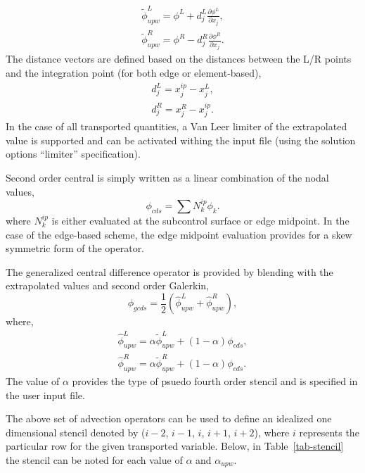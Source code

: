 \begin{eqnarray}
  \tilde \phi^L_{upw} = \phi^L + d^L_j \frac{\partial \phi^L }{\partial x_j}, \nonumber \\
  \tilde \phi^R_{upw} = \phi^R - d^R_j \frac{\partial \phi^R }{\partial x_j}.
\label{advUpwLR}
\end{eqnarray}
%
The distance vectors are defined based on the distances between the L/R points and the integration point 
(for both edge or element-based),
\begin{eqnarray}
  d^L_j = x^{ip}_j - x^L_j, \nonumber \\
  d^R_j = x^R_j - x^{ip}_j. 
\end{eqnarray}
\label{distanceVec}
In the case of all transported quantities, a Van Leer limiter of the extrapolated value is supported
and can be activated withing the input file (using the solution options ``limiter'' specification).

Second order central is simply written as a linear combination of the nodal values,
\begin{equation}
 \phi_{cds} = \sum N^{ip}_k \phi_k.
\label{phiCentral}
\end{equation}
%
where $N^{ip}_k$ is either evaluated at the subcontrol surface or edge midpoint. In the case
of the edge-based scheme, the edge midpoint evaluation provides for a skew symmetric form
of the operator. 

The generalized central difference operator is provided by blending with the extrapolated values and 
second order Galerkin,
\begin{equation}
 \phi_{gcds} = \frac{1}{2} \left(  \hat\phi^L_{upw} + \hat\phi^R_{upw} \right),
\label{phi4th}
\end{equation}
where,
\begin{eqnarray}
  \hat\phi^L_{upw} = \alpha \tilde \phi^L_{upw} + \left(1-\alpha\right) \phi_{cds}, \nonumber \\
  \hat\phi^R_{upw} = \alpha \tilde \phi^R_{upw} + \left(1-\alpha\right) \phi_{cds}.
\label{advNew4th}
\end{eqnarray}
The value of $\alpha$ provides the type of psuedo fourth order stencil and is specified in the user
input file.

The above set of advection operators can be used to define an idealized one dimensional stencil denoted
by ($i-2$, $i-1$, $i$, $i+1$, $i+2$), where $i$ represents the particular row for the given transported
variable. Below, in Table~\ref{tab-stencil} the stencil can be noted for each value of $\alpha$ and $\alpha_{upw}$.


